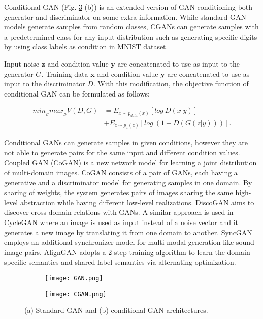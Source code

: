 \documentclass[runningheads]{llncs}
\begin{document}
Conditional GAN (Fig. \ref{fig:fig1} (b)) is an extended version of GAN \cite{mirza2014conditional} conditioning both generator and discriminator on some extra information. While standard GAN models generate samples from random classes, CGANs can generate samples with a predetermined class for any input distribution such as generating specific digits by using class labels as condition in MNIST dataset.

Input noise $\mathbf{z}$ and condition value $\mathbf{y}$  are concatenated to use as input to the generator $G$. Training data $\mathbf{x}$ and condition value $\mathbf{y}$ are concatenated to use as input to the discriminator $D$. With this modification, the objective function of conditional GAN can be formulated as follows:

\begin{equation}
\begin{split}
min_{_{G}}max_{_{D}}V(D,G) &= E_{x\sim p_{data}(x)}[log~D(x|y)] \\
&+  E_{z\sim p_{z}(z)}[log~ (1-D(G(z|y)))].
\end{split}
\end{equation}

Conditional GANs can generate samples in given conditions, however they are not able to generate pairs for the same input and different condition values. Coupled GAN (CoGAN) \cite{liu2016coupled} is a new network model for learning a joint distribution of multi-domain images. CoGAN consists of a pair of GANs, each having a generative and a discriminator model for generating samples in one domain. By sharing of weights, the system generates pairs of images sharing the same high-level abstraction while having different low-level realizations. DiscoGAN \cite{kim2017learning} aims to discover cross-domain relations with GANs. A similar approach is used in CycleGAN \cite{zhu2017unpaired} where an image is used as input instead of a noise vector and it generates a new image by translating it from one domain to another. SyncGAN \cite{chen2018syncgan} employs an additional synchronizer model for multi-modal generation like sound-image pairs. AlignGAN \cite{mao2017aligngan} adopts a 2-step training algorithm to learn the domain-specific semantics and shared label semantics via alternating optimization.

\begin{figure}
\centering
\begin{subfigure}{.7\textwidth}
  \centering
  \texttt{[image: GAN.png]}
  \caption{}
  \label{fig:sfig1}
\end{subfigure}%

\begin{subfigure}{.7\textwidth}
  \centering
  \texttt{[image: CGAN.png]}
  \caption{}
  \label{fig:sfig2}
\end{subfigure}
\caption{(a) Standard GAN and (b) conditional GAN architectures.}
\label{fig:fig1}
\end{figure}
\end{document}
